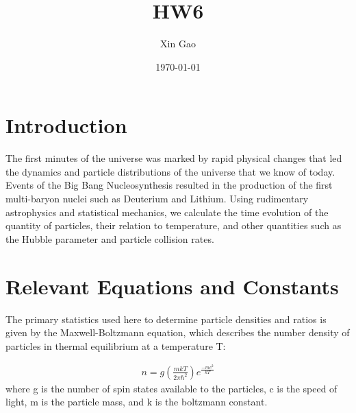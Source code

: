 \documentclass[12pt]{article}
\title{HW6}
\author{Xin Gao}
\date{\today}
\begin{document}
\maketitle

\section{Introduction}
The first minutes of the universe was marked by rapid physical changes that led the dynamics and particle distributions of the universe that we know of today. Events of the Big Bang Nucleosynthesis resulted in the production of the first multi-baryon nuclei such as Deuterium and Lithium. Using rudimentary astrophysics and statistical mechanics, we calculate the time evolution of the quantity of particles, their relation to temperature, and other quantities such as the Hubble parameter and particle collision rates.

\section{Relevant Equations and Constants}
The primary statistics used here to determine particle densities and ratios is given by the Maxwell-Boltzmann equation, which describes the number density of particles in thermal equilibrium at a temperature T:

\begin{align}n = g(\frac{mkT}{2\pi\hbar^2})e^{\frac{-mc^2}{kT}}
\end{align}where g is the number of spin states available to the particles, c is the speed of light, m is the particle mass, and k is the boltzmann constant.
\end{document}
